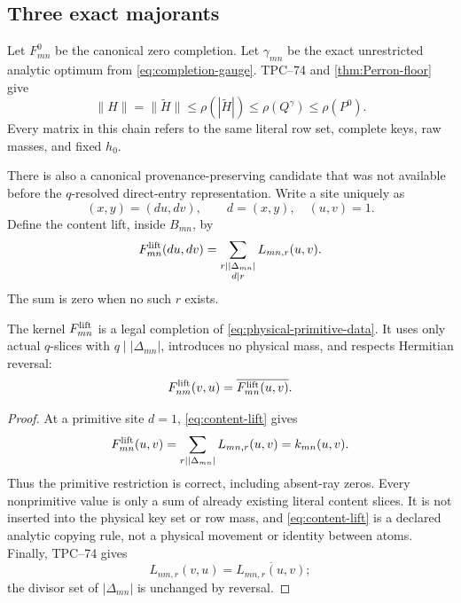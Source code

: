 \subsection{Three exact majorants}

Let \(F^0_{mn}\) be the canonical zero completion.  Let
\(\gamma_{mn}\) be the exact unrestricted analytic optimum from
\cref{eq:completion-gauge}.  TPC--74 and
\cref{thm:Perron-floor} give
\begin{equation}
 \|H\|=\|\widetilde H\|
 \le\rho(|\widetilde H|)
 \le\rho(Q^\gamma)
 \le\rho(P^0).
 \label{eq:physical-majorant-hierarchy}
\end{equation}
Every matrix in this chain refers to the same literal row set, complete
keys, raw masses, and fixed \(h_0\).

There is also a canonical provenance-preserving candidate that was not
available before the \(q\)-resolved direct-entry representation.
Write a site uniquely as
\[
 (x,y)=(du,dv),
 \qquad
 d=(x,y),\quad(u,v)=1.
\]
Define the content lift, inside \(B_{mn}\), by
\begin{equation}
 F^{\rm lift}_{mn}(du,dv)
 =
 \sum_{\substack{r\mid|\Delta_{mn}|\\d\mid r}}
 L_{mn,r}(u,v).
 \label{eq:content-lift}
\end{equation}
The sum is zero when no such \(r\) exists.

\begin{proposition}
\label{prop:literal-content-lift}
The kernel \(F^{\rm lift}_{mn}\) is a legal completion of
\eqref{eq:physical-primitive-data}.  It uses only actual
\(q\)-slices with \(q\mid|\Delta_{mn}|\), introduces no physical mass,
and respects Hermitian reversal:
\[
 F^{\rm lift}_{nm}(v,u)
 =
 \overline{F^{\rm lift}_{mn}(u,v)}.
\]
\end{proposition}

\begin{proof}
At a primitive site \(d=1\), \eqref{eq:content-lift} gives
\[
 F^{\rm lift}_{mn}(u,v)
 =
 \sum_{r\mid|\Delta_{mn}|}L_{mn,r}(u,v)
 =
 k_{mn}(u,v).
\]
Thus the primitive restriction is correct, including absent-ray zeros.
Every nonprimitive value is only a sum of already existing literal
content slices.  It is not inserted into the physical key set or row
mass, and \eqref{eq:content-lift} is a declared analytic copying rule,
not a physical movement or identity between atoms.  Finally, TPC--74 gives
\[
 L_{nm,r}(v,u)=\overline{L_{mn,r}(u,v)};
\]
the divisor set of \(|\Delta_{mn}|\) is unchanged by reversal.
\end{proof}

